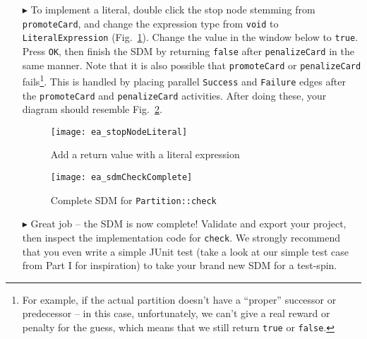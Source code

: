 \begin{itemize}
\item[$\blacktriangleright$] To implement a literal, double click the stop node stemming from  \texttt{promoteCard}, and change the expression type from
\texttt{void} to \texttt{LiteralEx\-pression} (Fig.~\ref{ea:sdm_check_literal_exp}). Change the value in the window below to \texttt{true}. Press \texttt{OK},
then finish the SDM by returning \texttt{false} after \texttt{penalizeCard} in the same manner. Note that it is also possible that \texttt{promoteCard} or 
\texttt{penalizeCard} fails\footnote{For example, if the actual partition doesn't have a ``proper'' successor or predecessor -- in this case, unfortunately, we can't 
give a real reward or penalty for the guess, which means that we still return \texttt{true} or \texttt{false}.}. This is handled by placing parallel \texttt{Success} 
and \texttt{Failure} edges after the \texttt{promoteCard} and \texttt{penalizeCard} activities. After doing these, your diagram should 
resemble Fig.~\ref{ea:sdm_check_finish}.

\begin{figure}[htbp]
\begin{center}
  \texttt{[image: ea\_stopNodeLiteral]}
  \caption{Add a return value with a literal expression}
  \label{ea:sdm_check_literal_exp}
\end{center}
\end{figure}

\begin{figure}[htbp]
\begin{center}
  \texttt{[image: ea\_sdmCheckComplete]}
  \caption{Complete SDM for \texttt{Partition::check}}
  \label{ea:sdm_check_finish}
\end{center}
\end{figure}

\item[$\blacktriangleright$] Great job -- the SDM is now complete! Validate and export your project, then inspect the implementation code for \texttt{check}. We
strongly recommend that you even write a simple JUnit test (take a look at our simple test case from Part I for inspiration) to take your brand new SDM for a
test-spin.

\end{itemize}
